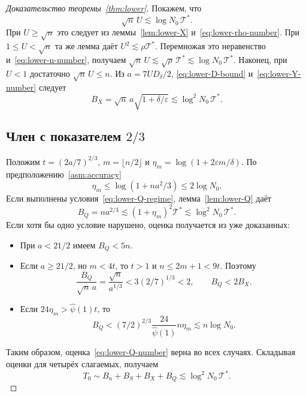 \begin{proof}[Доказательство теоремы~\ref{thm:lower}]
Покажем, что
\begin{equation}\label{eq:lower-Y-number}
 \sqrt n\,U\lesssim\log N_0\,\mathcal T^\ast.
\end{equation}
При $U\ge\sqrt n$ это следует из леммы~\ref{lem:lower-X}
и~\eqref{eq:lower-rho-number}.
При $1\le U<\sqrt n$ та же лемма даёт $U^2\lesssim\rho\mathcal T^\ast$.
Перемножая это неравенство и~\eqref{eq:lower-n-number}, получаем
$\sqrt n\,U\lesssim\sqrt\rho\,\mathcal T^\ast\lesssim\log N_0\,\mathcal T^\ast$.
Наконец, при $U<1$ достаточно $\sqrt n\,U\le n$.
Из $a=7UD_\delta/2$, \eqref{eq:lower-D-bound}
и~\eqref{eq:lower-Y-number} следует
\begin{equation}\label{eq:lower-X-number}
 B_X=\sqrt n\,a\sqrt{1+\delta/\varepsilon}
 \lesssim\log^2N_0\,\mathcal T^\ast.
\end{equation}

\subsection{Член с показателем \texorpdfstring{$2/3$}{2/3}}
Положим $t=(2a/7)^{2/3}$, $m=\lfloor n/2\rfloor$ и
$\eta_m=\log(1+2\varepsilon m/\delta)$.
По предположению~\ref{asm:accuracy}
\[
 \eta_m\le\log(1+na^2/3)\le2\log N_0.
\]
Если выполнены условия~\eqref{eq:lower-Q-regime},
лемма~\ref{lem:lower-Q} даёт
\begin{equation}\label{eq:lower-Q-number}
 B_Q=na^{2/3}\lesssim(1+\eta_m)^2\mathcal T^\ast
 \lesssim\log^2N_0\,\mathcal T^\ast.
\end{equation}
Если хотя бы одно условие нарушено, оценка получается из уже доказанных:
\begin{itemize}
\item При $a<21/2$ имеем $B_Q<5n$.
\item Если $a\ge21/2$, но $m<4t$, то $t>1$ и
$n\le2m+1<9t$. Поэтому
\[
 \frac{B_Q}{\sqrt n\,a}=\frac{\sqrt n}{a^{1/3}}
 <3(2/7)^{1/3}<2,
 \qquad B_Q<2B_X.
\]
\item Если $24\eta_m>\widehat\psi(1)t$, то
\[
 B_Q<(7/2)^{2/3}\frac{24}{\widehat\psi(1)}n\eta_m
 \lesssim n\log N_0.
\]
\end{itemize}
Таким образом, оценка~\eqref{eq:lower-Q-number} верна во всех случаях.
Складывая оценки для четырёх слагаемых, получаем
\[
 T_0\sim B_n+B_S+B_X+B_Q
 \lesssim\log^2N_0\,\mathcal T^\ast.
\]
\end{proof}
